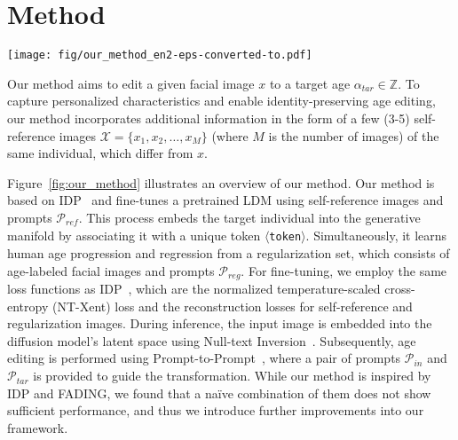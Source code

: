 \section{Method}
\label{chap:method}

\begin{figure*}[t]
  \centering
  \texttt{[image: fig/our\_method\_en2-eps-converted-to.pdf]}
  \caption{
Overview of our method. In the training phase, we fine-tune a pretrained diffusion model~\cite{rombach2022high} using a refined regularization set (see Section~\ref{sec:int_age}) and self-reference images labeled with integer ages. We employ LoRA~\cite{hu2021lora} to avoid overfitting on these images (see Section~\ref{sec:lora}). In the inference phase, from input image $x$, we first obtain a latent representation $x_T$ using Null-text Inversion~\cite{mokady2023null} and apply Prompt-to-prompt~\cite{hertz2022prompt} with original age $\alpha_\mathit{in}$ and target age $\alpha_\mathit{tar}$ to generate age-edited image $y$. We carefully design the text prompts $\mathcal{P}_\mathit{ref}$, $\mathcal{P}_\mathit{reg}$, $\mathcal{P}_\mathit{in}$, and $\mathcal{P}_\mathit{tar}$ for more accurate age transformation (see Section~\ref{sec:prompt_design} and Table~\ref{tab:prompt}).
  }
  \label{fig:our_method}
\end{figure*}

Our method aims to edit a given facial image $x$ to a target age $\alpha_\mathit{tar} \in \mathbb{Z}$. 
To capture personalized characteristics and enable identity-preserving age editing, our method incorporates additional information in the form of a few (3-5) self-reference images $\mathcal{X}=\{x_1,x_2,\ldots,x_M\}$ (where $M$ is the number of images) of the same individual, which differ from $x$.

Figure~\ref{fig:our_method} illustrates an overview of our method.
Our method is based on IDP~\cite{banerjee2023identity} and fine-tunes a pretrained LDM using self-reference images and prompts $\mathcal{P}_\mathit{ref}$.
This process embeds the target individual into the generative manifold by associating it with a unique token \texttt{$\langle$token$\rangle$}.
Simultaneously, it learns human age progression and regression from a regularization set, which consists of age-labeled facial images and prompts $\mathcal{P}_\mathit{reg}$.
For fine-tuning, we employ the same loss functions as IDP~\cite{banerjee2023identity}, which are the normalized temperature-scaled cross-entropy (NT-Xent) loss and the reconstruction losses for self-reference and regularization images. 
During inference, the input image is embedded into the diffusion model's latent space using Null-text Inversion~\cite{mokady2023null}.
Subsequently, age editing is performed using Prompt-to-Prompt~\cite{hertz2022prompt}, where a pair of prompts $\mathcal{P}_\mathit{in}$ and $\mathcal{P}_\mathit{tar}$ is provided to guide the transformation.
While our method is inspired by IDP and FADING, we found that a na\"ive combination of them does not show sufficient performance, and thus we introduce further improvements into our framework. 

